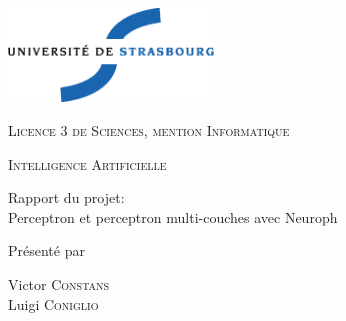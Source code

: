 \thispagestyle{empty}

\begin{center}
       \noindent
       \includegraphics[height=2.5cm]{./pics/uds.eps}       
       
       \vfill\vfill

    {\large \textsc{Licence 3 de Sciences, mention Informatique}}

    \bigskip\bigskip

    {\large \textsc{Intelligence Artificielle}}

    \vfill\vfill

    {\huge \sc
      \begin{center} 
        Rapport du projet: \\
        Perceptron et perceptron multi-couches avec Neuroph
      \end{center}}

    \vfill\vfill

    {\large Présenté par}

\medskip

    {\large Victor \textsc{Constans}}\\
    {\large Luigi  \textsc{Coniglio}}\\
\bigskip

\end{center}
